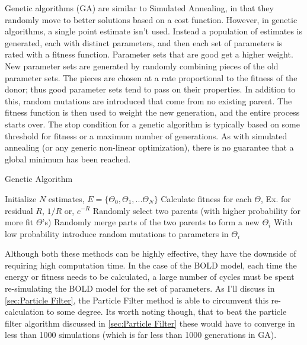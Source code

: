 Genetic algorithms (GA) are similar to Simulated Annealing, in
that they randomly move to better solutions based on a cost function.
However, in genetic algorithms, a single point estimate isn't used. Instead
a population of estimates is generated, each with distinct parameters,
and then each set of parameters is rated with a fitness function. Parameter
sets that are good get a higher weight. New parameter sets are generated by 
randomly combining pieces of the old parameter sets. The pieces are 
chosen at a rate proportional to the fitness of the donor; thus good
parameter sets tend to pass on their properties. In addition to this,
random mutations are introduced that come from no existing parent. 
The fitness function is then used to weight the new generation, and
the entire process starts over. The stop condition for a genetic algorithm
is typically based on some threshold for fitness or a maximum number 
of generations. As with simulated annealing (or any generic non-linear optimization),
there is no guarantee that a global minimum has been reached.

\begin{algorithm}
\caption{Genetic Algorithm}
\label{alg:Genetic Algorithm}
\begin{algorithmic}
\STATE Initialize $N$ estimates, $E = \{\Theta_0, \Theta_1, ... \Theta_N\}$
    \STATE Calculate fitness for each $\Theta$, Ex. for residual $R$, $1/R$ or, $e^{-R}$
        \STATE Randomly select two parents (with higher probability for more fit $\Theta$'s)
        \STATE Randomly merge parts of the two parents to form a new $\Theta_i$
        \STATE With low probability introduce random mutations to parameters in $\Theta_i$
    \ENDFOR
\ENDFOR
\end{algorithmic}
\end{algorithm}

Although both these methods can be highly effective, they have the downside of
requiring high computation time. In the case of the BOLD model,
each time the energy or fitness needs to be calculated, a large number of cycles
must be spent re-simulating the BOLD model for the set of parameters. As I'll
discuss in \autoref{sec:Particle Filter}, the Particle Filter method is able
to circumvent this re-calculation to some degree. Its worth noting though, that 
to beat the particle filter algorithm discussed in \autoref{sec:Particle Filter} 
these would have to converge in less than 1000 simulations (which is far less than
1000 generations in GA). 


